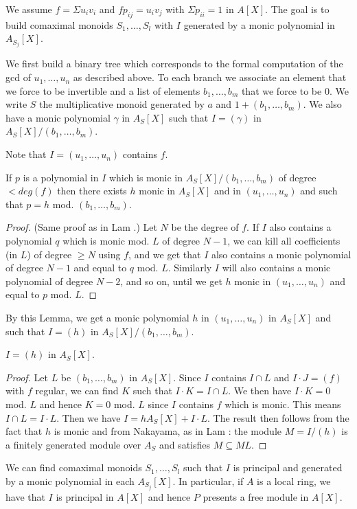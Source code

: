 We assume $f = \Sigma u_iv_i$ and $fp_{ij} = u_iv_j$ with $\Sigma p_{ii} = 1$
in $A[X]$. The goal is to build comaximal monoids $S_1,\dots,S_l$ with $I$ generated by
a monic polynomial in $A_{S_j}[X]$.

We first build a binary tree which corresponds to the formal computation of the gcd of
$u_1,\dots,u_n$ as described above. To each branch we associate an element that
we force to be invertible and a list of elements $b_1,\dots,b_m$ that we force to be $0$.
We write $S$ the multiplicative monoid generated by $a$ and $1 + (b_1,\dots,b_m)$.
We also have a monic polynomial $\gamma$ in $A_S[X]$ 
such that $I = (\gamma)$ in $A_S[X]/(b_1,\dots,b_m)$.

 Note that $I = (u_1,\dots,u_n)$ contains $f$.

\begin{lemma}
  If $p$ is a polynomial in $I$ which is monic in $A_S[X]/(b_1,\dots,b_m)$ of degree $<deg(f)$
  then there exists $h$ monic in
  $A_S[X]$ and in $(u_1,\dots,u_n)$ and such that $p=h$ mod. $(b_1,\dots,b_m)$.
\end{lemma}

\begin{proof}
  (Same proof as in Lam \cite{Lam}.) Let $N$ be the degree of $f$.
  If $I$ also contains a polynomial $q$ which is monic
  mod. $L$ of degree $N-1$, we can kill all coefficients (in $L$) of degree $\geqslant N$
  using $f$, and we get that $I$ also contains a monic polynomial of degree $N-1$
  and equal to $q$ mod. $L$.
  Similarly $I$ will also contains a monic polynomial of degree $N-2$, and so on, until
  we get $h$ monic in $(u_1,\dots,u_n)$ and equal to $p$ mod. $L$.
\end{proof}

By this Lemma, we get a monic polynomial $h$ in $(u_1,\dots,u_n)$ in $A_S[X]$
and such that $I=(h)$ in $A_S[X]/(b_1,\dots,b_m)$.

\begin{lemma}
 $I = (h)$ in $A_{S}[X]$.
\end{lemma}

\begin{proof}
  Let $L$ be $(b_1,\dots,b_m)$ in $A_S[X]$.
  Since $I$ contains $I\cap L$ and $I\cdot J = (f)$ with $f$ regular, we can find $K$
  such that $I\cdot K = I\cap L$.
  We then have $I\cdot K = 0$ mod. $L$ and hence $K = 0$ mod. $L$ since $I$ contains $f$
  which is monic.
  This means $I\cap L = I\cdot L$. Then we have $I = hA_S[X] + I\cdot L$.
  The result then follows from the fact that $h$ is monic and from Nakayama, as in Lam \cite{Lam}:
  the module $M = I/(h)$ is a finitely generated module over $A_S$ and satisfies
  $M\subseteq ML$.
\end{proof}

\begin{corollary}
  We can find comaximal monoids $S_1,\dots,S_l$ such that $I$ is principal and generated by a
  monic polynomial in each $A_{S_j}[X]$.
  In particular, if $A$ is a local ring, we have that $I$ is principal in $A[X]$ and hence $P$
  presents a free module in $A[X]$.
\end{corollary}
